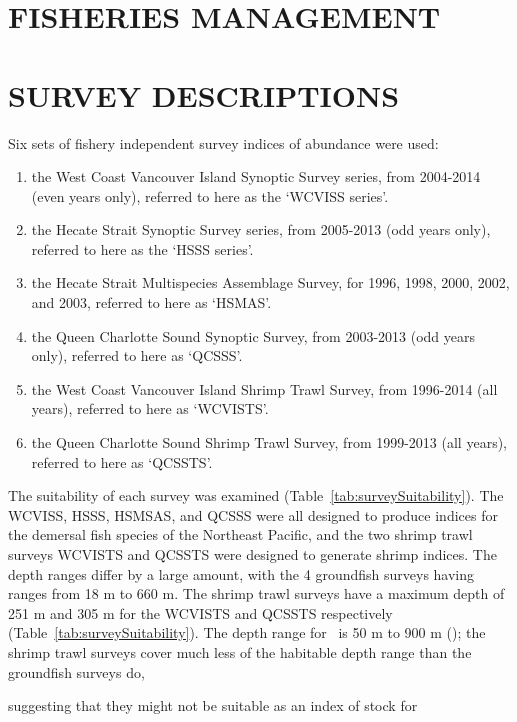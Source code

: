 \section{FISHERIES MANAGEMENT}

\clearpage

\section{SURVEY DESCRIPTIONS}

Six sets of fishery independent survey indices of abundance were used:

\begin{enumerate}
  \item the West Coast Vancouver Island Synoptic Survey series, from 2004-2014 (even years only), referred to here as the `WCVISS series'.
  \item the Hecate Strait Synoptic Survey series, from 2005-2013 (odd years only), referred to here as the `HSSS series'.
  \item the Hecate Strait Multispecies Assemblage Survey, for 1996, 1998, 2000, 2002, and 2003, referred to here as `HSMAS'.
  \item the Queen Charlotte Sound Synoptic Survey, from 2003-2013 (odd years only), referred to here as `QCSSS'.
  \item the West Coast Vancouver Island Shrimp Trawl Survey, from 1996-2014 (all years), referred to here as `WCVISTS'.
  \item the Queen Charlotte Sound Shrimp Trawl Survey, from 1999-2013 (all years), referred to here as `QCSSTS'.
\end{enumerate}

The suitability of each survey was examined (Table~\ref{tab:surveySuitability}). The WCVISS, HSSS, HSMSAS, and QCSSS were all designed to produce indices for the demersal fish species of the Northeast Pacific, and the two shrimp trawl surveys WCVISTS and QCSSTS were designed to generate shrimp indices. The depth ranges differ by a large amount, with the 4 groundfish surveys having ranges from 18 m to 660 m. The shrimp trawl surveys have a maximum depth of 251 m and 305 m for the WCVISTS and QCSSTS respectively (Table~\ref{tab:surveySuitability}). The depth range for \fishname\ is 50 m to 900 m (\citet{arf2001}); the shrimp trawl surveys cover much less of the habitable depth range than the groundfish surveys do, 

suggesting that they might not be suitable as an index of stock for

